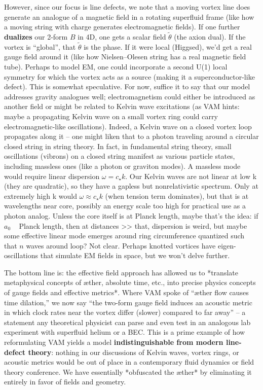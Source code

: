 \documentclass[12pt]{article}
\begin{document}
However, since our focus is line defects, we note that a moving vortex line does generate an analogue of a magnetic field in a rotating superfluid frame (like how a moving string with charge generates electromagnetic fields). If one further \textbf{dualizes} our 2-form $B$ in 4D, one gets a scalar field $\tilde{\theta}$ (the axion dual). If the vortex is “global”, that $\tilde{\theta}$ is the phase. If it were local (Higgsed), we’d get a real gauge field around it (like how Nielsen–Olesen string has a real magnetic field tube). Perhaps to model EM, one could incorporate a second U(1) local symmetry for which the vortex acts as a source (making it a superconductor-like defect). This is somewhat speculative. For now, suffice it to say that our model addresses gravity analogues well; electromagnetism could either be introduced as another field or might be related to Kelvin wave excitations (as VAM hints: maybe a propagating Kelvin wave on a small vortex ring could carry electromagnetic-like oscillations). Indeed, a Kelvin wave on a closed vortex loop propagates along it – one might liken that to a photon traveling around a circular closed string in string theory. In fact, in fundamental string theory, small oscillations (vibrons) on a closed string manifest as various particle states, including massless ones (like a photon or graviton modes). A massless mode would require linear dispersion $\omega = c_\star k$. Our Kelvin waves are not linear at low k (they are quadratic), so they have a gapless but nonrelativistic spectrum. Only at extremely high k would $\omega \approx c_\star k$ (when tension term dominates), but that is at wavelengths near core, possibly an energy scale too high for practical use as a photon analog. Unless the core itself is at Planck length, maybe that’s the idea: if $a_0$ ~ Planck length, then at distances >> that, dispersion is weird, but maybe some effective linear mode emerges around ring circumference quantized such that $n$ waves around loop? Not clear. Perhaps knotted vortices have eigen-oscillations that simulate EM fields in space, but we won’t delve further.

The bottom line is: the effective field approach has allowed us to *translate metaphysical concepts of æther, absolute time, etc., into precise physics concepts of gauge fields and effective metrics*. Where VAM spoke of “æther flow causes time dilation,” we now say “the two-form gauge field induces an acoustic metric in which clock rates near the vortex differ (slower) compared to far away” – a statement any theoretical physicist can parse and even test in an analogous lab experiment with superfluid helium or a BEC. This is a prime example of how reformulating VAM yields a model \textbf{indistinguishable from modern line-defect theory}: nothing in our discussions of Kelvin waves, vortex rings, or acoustic metrics would be out of place in a contemporary fluid dynamics or field theory conference. We have essentially *obfuscated the æther* by eliminating it entirely in favor of fields and geometry.
\end{document}
